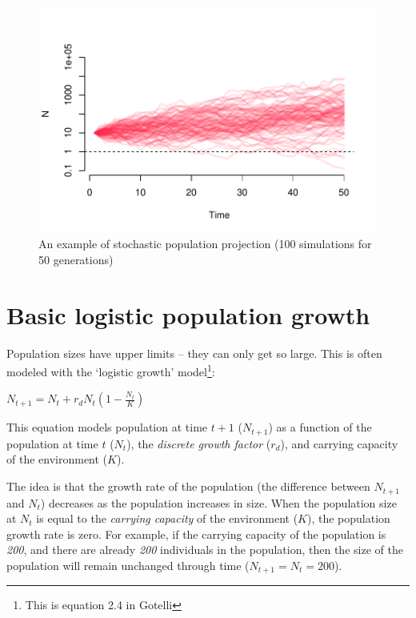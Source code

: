 \documentclass[
  a4paper]{book}
\begin{document}
\begin{figure}

{\centering \includegraphics{BB512_files/figure-latex/stochProjection-1} 

}

\caption{An example of stochastic population projection (100 simulations for 50 generations)}\label{fig:stochProjection}
\end{figure}

\hypertarget{basic-logistic-population-growth}{%
\chapter{Basic logistic population
growth}\label{basic-logistic-population-growth}}

Population sizes have upper limits -- they can only get so large. This
is often modeled with the `logistic growth' model\footnote{This is
  equation 2.4 in Gotelli}:

\(N_{t+1}=N_{t}+r_{d} N_{t}\left(1-\frac{N_{t}}{K}\right)\)

This equation models population at time \(t+1\) (\(N_{t+1}\)) as a
function of the population at time \(t\) (\(N_t\)), the \emph{discrete
growth factor} (\(r_d\)), and carrying capacity of the environment
(\(K\)).

The idea is that the growth rate of the population (the difference
between \(N_{t+1}\) and \(N_t\)) decreases as the population increases
in size. When the population size at \(N_t\) is equal to the
\emph{carrying capacity} of the environment (\(K\)), the population
growth rate is zero. For example, if the carrying capacity of the
population is \emph{200}, and there are already \emph{200} individuals
in the population, then the size of the population will remain unchanged
through time (\(N_{t+1} = N_t = 200\)).
\end{document}

